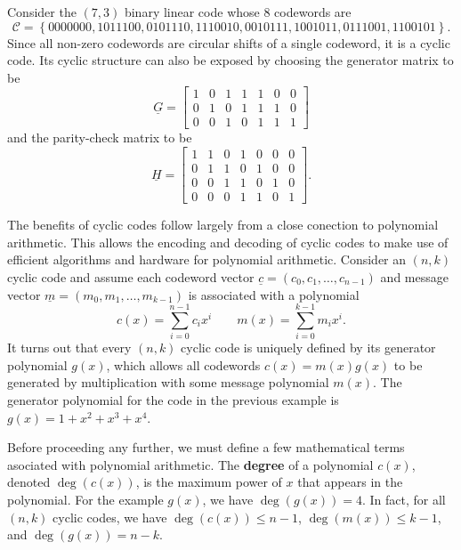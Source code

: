 \begin{example}
Consider the $(7,3)$ binary linear code whose 8 codewords are
\[ \mathcal{C} = \left\{
0000000,
1011100,
0101110,
1110010,
0010111,
1001011,
0111001,
1100101
\right\}. \]
Since all non-zero codewords are circular shifts of a single codeword, it is a cyclic code.
Its cyclic structure can also be exposed by choosing the generator matrix to be
\[ \underline{G} = \left[ \begin{array}{ccccccc}
1 & 0 & 1 & 1 & 1 & 0 & 0 \\
0 & 1 & 0 & 1 & 1 & 1 & 0 \\
0 & 0 & 1 & 0 & 1 & 1 & 1 \end{array} \right] \]
and the parity-check matrix to be
\[ \underline{H} = \left[ \begin{array}{ccccccc}
1 & 1 & 0 & 1 & 0 & 0 & 0 \\
0 & 1 & 1 & 0 & 1 & 0 & 0 \\
0 & 0 & 1 & 1 & 0 & 1 & 0 \\
0 & 0 & 0 & 1 & 1 & 0 & 1 \end{array} \right]. \]
\end{example}

The benefits of cyclic codes follow largely from a close conection to polynomial arithmetic.
This allows the encoding and decoding of cyclic codes to make use of efficient algorithms and hardware for polynomial arithmetic.
Consider an $(n,k)$ cyclic code and assume each codeword vector $\underline{c}=(c_0,c_1,\ldots,c_{n-1})$ and message vector $\underline{m}=(m_0,m_1,\ldots,m_{k-1})$ is associated with a polynomial
\[ c(x) = \sum_{i=0}^{n-1} c_i x^i \quad \quad  m(x) = \sum_{i=0}^{k-1} m_i x^i. \]
It turns out that every $(n,k)$ cyclic code is uniquely defined by its generator polynomial $g(x)$, which allows all codewords $c(x)=m(x)g(x)$ to be generated by multiplication with some message polynomial $m(x)$.
The generator polynomial for the code in the previous example is $g(x) = 1 + x^2 + x^3 + x^4$.

Before proceeding any further, we must define a few mathematical terms asociated with polynomial arithmetic.
The \textbf{degree} of a polynomial $c(x)$, denoted $\deg\left( c(x) \right)$, is the maximum power of $x$ that appears in the polynomial.
For the example $g(x)$, we have $\deg \left( g(x) \right) = 4$.
In fact, for all $(n,k)$ cyclic codes, we have
$\deg \left( c(x) \right) \leq n-1$,
$\deg \left( m(x) \right) \leq k-1$, and
$\deg \left( g(x) \right) = n-k$.

